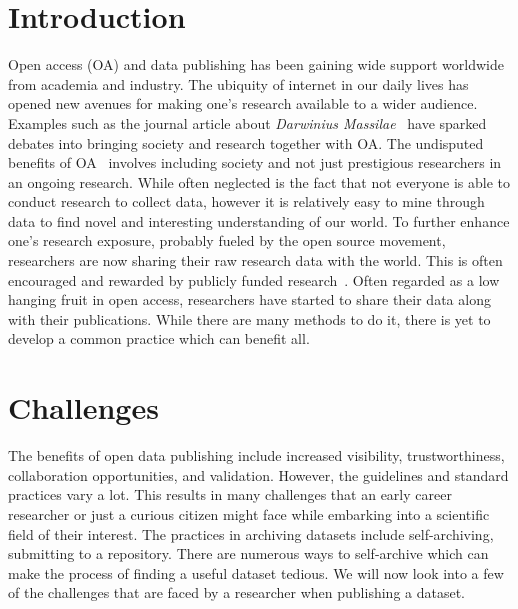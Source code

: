 \documentclass[12pt]{elsarticle}
\begin{document}
\section*{Introduction}
Open access (OA) and data publishing has been gaining wide support worldwide from academia and industry. 
The ubiquity of internet in our daily lives has opened new avenues for making one's research available to a wider audience. 
Examples such as the journal article about \textit{Darwinius Massilae}~\cite{franzen2009complete} have sparked debates into bringing society and research together with OA. 
The undisputed benefits of OA~\cite{eysenbach2006citation, willinsky2006access} involves including society and not just prestigious researchers in an ongoing research. 
While often neglected is the fact that not everyone is able to conduct research to collect data, however it is relatively easy to mine through data to find novel and interesting understanding of our world. 
To further enhance one's research exposure, probably fueled by the open source movement, researchers are now sharing their raw research data with the world. 
This is often encouraged and rewarded by publicly funded research~\cite{openaccessEU,openaccessrcn}. 
Often regarded as a low hanging fruit in open access, researchers have started to share their data along with their publications. 
While there are many methods to do it, there is yet to develop a common practice which can benefit all. 
\section*{Challenges}
The benefits of open data publishing include increased visibility, trustworthiness, collaboration opportunities, and validation. 
However, the guidelines and standard practices vary a lot. 
This results in many challenges that an early career researcher or just a curious citizen might face while embarking into a scientific field of their interest. 
The practices in archiving datasets include self-archiving, submitting to a repository. 
There are numerous ways to self-archive which can make the process of finding a useful dataset tedious. 
We will now look into a few of the challenges that are faced by a researcher when publishing a dataset. 
\end{document}
